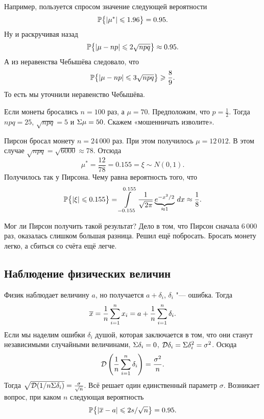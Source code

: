 Например, пользуется спросом значение следующей вероятности
\[
  \P\big\{|\mu^*|\le 1.96\big\}  = 0.95.
\]
Ну и раскручивая назад
\[
  \P\big\{|\mu - np|\le 2\sqrt{npq}\big\}\approx 0.95.
\]
А из неравенства Чебышёва следовало, что
\[
  \P\big\{|\mu-np|\le 3\sqrt{npq}\big\} \ge \frac 89.
\]
То есть мы уточнили неравенство Чебышёва.

Если монеты бросались $n=100$ раз, а $\mu=70$. Предположим, что $p=\frac12$. Тогда $npq = 25$, $\sqrt{npq} = 5$ и  $\E\mu = 50$. Скажем «мошенничать изволите».

Пирсон бросал монету $n=24\,000$ раз. При этом получилось $\mu=12\,012$. В этом случае $\sqrt{npq} = \sqrt{6000} \approx 78$. Отсюда
\[
  \mu^* = \frac{12}{78} = 0.155 = \xi\sim N(0,1).
\]
Получилось так у Пирсона. Чему равна вероятность того, что
\[
  \P\big\{|\xi|\le 0.155\big\} = \int\limits_{-0.155}^{0.155} \frac1{\sqrt{2\pi}} \underbrace{e^{-x^2/2}}_{\approx 1}\,dx \approx \frac18.
\]

Мог ли Пирсон получить такой результат? Дело в том, что Пирсон сначала 6\,000 раз, оказалась слишком большая разница. Решил ещё побросать. Бросать монету легко, а сбиться со счёта ещё легче.

\subsection{Наблюдение физических величин}
Физик наблюдает величину $a$, но получается $a + \delta_i$, $\delta_i$ "--- ошибка. Тогда
\[
  \ol x = \frac1n \RY i1n x_i = a + \frac1n \RY i1n \delta_i.
\]
Если мы наделим ошибки $\delta_i$ душой, которая заключается в том, что они станут независимыми случайными величинами, $\E\delta_i = 0$, $\D \delta_i = \E \delta_i^2 = \sigma^2$. Осюда
\[
  \D\left( \frac1n \RY i1n \delta_i \right) = \frac{\sigma^2}n.
\]
Тогда $\sqrt{\D(1/n \Sigma \delta_i)} = \frac\sigma{\sqrt n}$. Всё решает один единственный параметр $\sigma$. Возникает вопрос, при каком $n$ следующая вероятность
\[
\P  \big\{|\ol x - a| \le 2s/\sqrt{n}\big\} = 0.95.
\]
